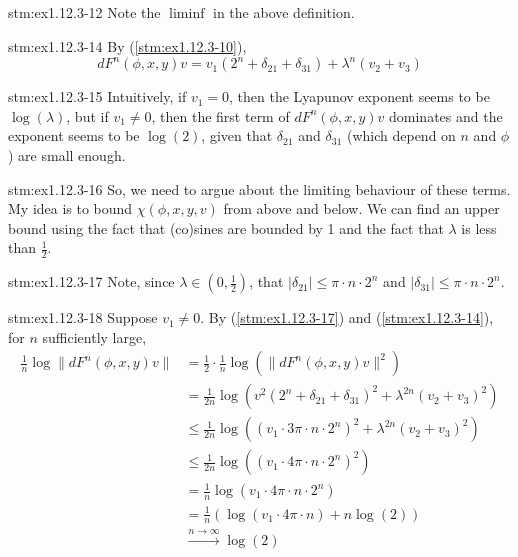 \begin{explanation}{stm:ex1.12.3-12}
Note the $\liminf$ in the above definition.
\end{explanation}

\begin{statement}{stm:ex1.12.3-14}
By (\ref{stm:ex1.12.3-10}),
\[
dF^n(\phi, x, y)v = v_1 (2^n + \delta_{21} + \delta_{31}) + \lambda^n (v_2 + v_3)
\]
\end{statement}

\begin{explanation}{stm:ex1.12.3-15}
Intuitively, if $v_1 = 0$, then the Lyapunov exponent seems to be $\log(\lambda)$, but if $v_1 \neq 0$, then the first term of $dF^n(\phi, x, y)v$ dominates and the exponent seems to be $\log(2)$, given that $\delta_{21}$ and $\delta_{31}$ (which depend on $n$ and $\phi$) are small enough.
\end{explanation}

\begin{explanation}{stm:ex1.12.3-16}
So, we need to argue about the limiting behaviour of these terms. My idea is to bound $\chi(\phi, x, y, v)$ from above and below. We can find an upper bound using the fact that (co)sines are bounded by 1 and the fact that $\lambda$ is less than $\frac{1}{2}$.
\end{explanation}

\begin{statement}{stm:ex1.12.3-17}
Note, since $\lambda \in (0, \frac{1}{2})$, that $|\delta_{21}| \le \pi \cdot n \cdot 2^n$ and $|\delta_{31}| \le \pi \cdot n \cdot 2^n$.
\end{statement}

\begin{statement}{stm:ex1.12.3-18}
Suppose $v_1 \neq 0$. By (\ref{stm:ex1.12.3-17}) and (\ref{stm:ex1.12.3-14}), for $n$ sufficiently large,
\begin{align*}
\frac{1}{n} \log \| dF^n(\phi, x, y)v \| 
&= \frac{1}{2} \cdot \frac{1}{n} \log \left( \| dF^n(\phi, x, y)v \|^2 \right) \\
&= \frac{1}{2n} \log \left( v^2 (2^n + \delta_{21} + \delta_{31})^2 + \lambda^{2n}(v_2 + v_3)^2 \right) \\
&\le \frac{1}{2n} \log \left( (v_1 \cdot 3 \pi \cdot n \cdot 2^n)^2 + \lambda^{2n}(v_2 + v_3)^2 \right) \\
&\le \frac{1}{2n} \log \left( (v_1 \cdot 4 \pi \cdot n \cdot 2^n)^2 \right) \\
&= \frac{1}{n} \log (v_1 \cdot 4 \pi \cdot n \cdot 2^n) \\
&= \frac{1}{n} \left( \log(v_1 \cdot 4 \pi \cdot n) + n \log(2) \right)\\
&\xrightarrow{n \to \infty} \log(2)
\end{align*}
\end{statement}

